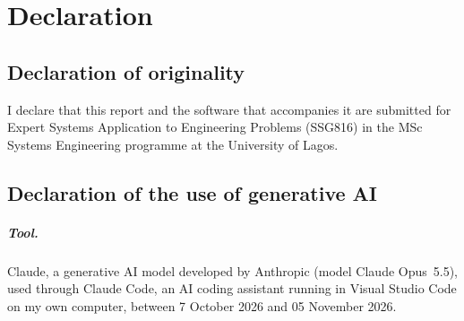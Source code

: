 \newcommand{\fillin}[1]{\textbf{[TO COMPLETE: #1]}}

\chapter*{Declaration}

\section*{Declaration of originality}

I declare that this report and the software that accompanies it are submitted for Expert Systems Application to Engineering Problems (SSG816) in the MSc Systems Engineering programme at the University of Lagos.

\section*{Declaration of the use of generative AI}

\paragraph{Tool.} Claude, a generative AI model developed by Anthropic (model Claude Opus~5.5), used through Claude Code, an AI coding assistant running in Visual Studio Code on my own computer, between 7 October 2026 and 05 November 2026.

